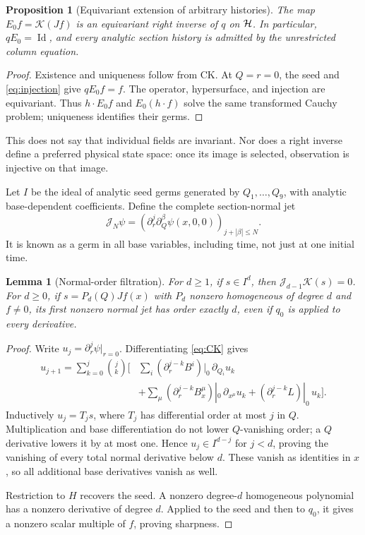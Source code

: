 \documentclass[11pt]{article}
\newtheorem{proposition}[theorem]{Proposition}
\newtheorem{lemma}[theorem]{Lemma}
\theoremstyle{definition}\newtheorem{definition}[theorem]{Definition}
\theoremstyle{remark}\newtheorem{remark}[theorem]{Remark}
\DeclareMathOperator{\Id}{Id}
\newcommand{\CK}{\mathcal K}\newcommand{\Jet}{\mathcal J}
\begin{document}
\begin{proposition}[Equivariant extension of arbitrary histories]\label{prop:onto}
The map $E_0f=\CK(Jf)$ is an equivariant right inverse of $q$ on $\mathcal H$. In particular, $qE_0=\Id$, and every analytic section history is admitted by the unrestricted column equation.
\end{proposition}
\begin{proof}
Existence and uniqueness follow from CK. At $Q=r=0$, the seed and \eqref{eq:injection} give $qE_0f=f$. The operator, hypersurface, and injection are equivariant. Thus $h\cdot E_0f$ and $E_0(h\cdot f)$ solve the same transformed Cauchy problem; uniqueness identifies their germs.
\end{proof}
This does not say that individual fields are invariant. Nor does a right inverse define a preferred physical state space: once its image is selected, observation is injective on that image.

Let $I$ be the ideal of analytic seed germs generated by $Q_1,\ldots,Q_9$, with analytic base-dependent coefficients. Define the complete section-normal jet
\[
 \Jet_N\psi=\left(\partial_r^j\partial_Q^\beta\psi(x,0,0)\right)_{j+|\beta|\le N}.
\]
It is known as a germ in all base variables, including time, not just at one initial time.

\begin{lemma}[Normal-order filtration]\label{lem:order}
For $d\ge1$, if $s\in I^d$, then $\Jet_{d-1}\CK(s)=0$. For $d\ge0$, if $s=P_d(Q)Jf(x)$ with $P_d$ nonzero homogeneous of degree $d$ and $f\ne0$, its first nonzero normal jet has order exactly $d$, even if $q_0$ is applied to every derivative.
\end{lemma}
\begin{proof}
Write $u_j=\partial_r^j\psi|_{r=0}$. Differentiating \eqref{eq:CK} gives
\begin{align*}
 u_{j+1}=\sum_{k=0}^j\binom jk\bigg[
 &\sum_i(\partial_r^{j-k}B^i)|_0\,\partial_{Q_i}u_k\\
 &+\sum_\mu(\partial_r^{j-k}B_x^\mu)|_0\,\partial_{x^\mu}u_k
 +(\partial_r^{j-k}L)|_0\,u_k\bigg].
\end{align*}
Inductively $u_j=T_js$, where $T_j$ has differential order at most $j$ in $Q$. Multiplication and base differentiation do not lower $Q$-vanishing order; a $Q$ derivative lowers it by at most one. Hence $u_j\in I^{d-j}$ for $j<d$, proving the vanishing of every total normal derivative below $d$. These vanish as identities in $x$, so all additional base derivatives vanish as well.

Restriction to $H$ recovers the seed. A nonzero degree-$d$ homogeneous polynomial has a nonzero derivative of degree $d$. Applied to the seed and then to $q_0$, it gives a nonzero scalar multiple of $f$, proving sharpness.
\end{proof}
\end{document}
